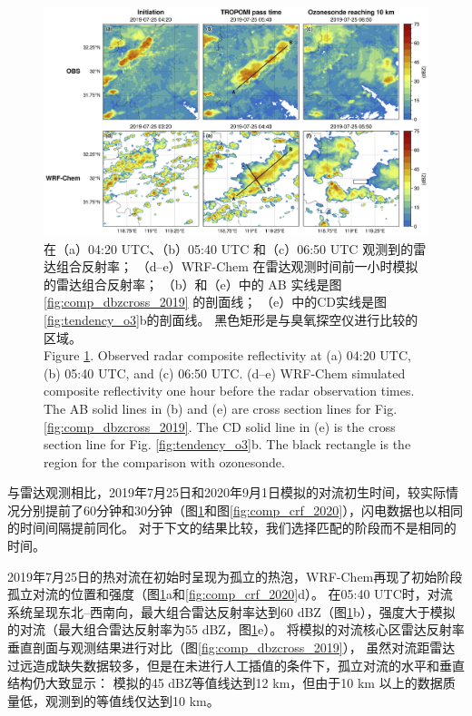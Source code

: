 \begin{figure}[H]
\centering
\includegraphics[width=\textwidth]{./figures/comp_crf_2019.png}
\caption{在（a）04:20 UTC、（b）05:40 UTC 和（c）06:50 UTC 观测到的雷达组合反射率；
         （d--e）WRF-Chem 在雷达观测时间前一小时模拟的雷达组合反射率；
         （b）和（e）中的 AB 实线是图 \ref{fig:comp_dbzcross_2019} 的剖面线；
         （e）中的CD实线是图\ref{fig:tendency_o3}b的剖面线。
         黑色矩形是与臭氧探空仪进行比较的区域。\\
         Figure \ref{fig:comp_crf_2019}. Observed radar composite reflectivity at (a) 04:20 UTC, (b) 05:40 UTC, and (c) 06:50 UTC.
        (d--e) WRF-Chem simulated composite reflectivity one hour before the radar observation times.
        The AB solid lines in (b) and (e) are cross section lines for Fig. \ref{fig:comp_dbzcross_2019}.
        The CD solid line in (e) is the cross section line for Fig. \ref{fig:tendency_o3}b.
        The black rectangle is the region for the comparison with ozonesonde.}
\label{fig:comp_crf_2019}
\end{figure}


与雷达观测相比，2019年7月25日和2020年9月1日模拟的对流初生时间，较实际情况分别提前了60分钟和30分钟（图\ref{fig:comp_crf_2019}和图\ref{fig:comp_crf_2020}），闪电数据也以相同的时间间隔提前同化。
对于下文的结果比较，我们选择匹配的阶段而不是相同的时间。

2019年7月25日的热对流在初始时呈现为孤立的热泡，WRF-Chem再现了初始阶段孤立对流的位置和强度（图\ref{fig:comp_crf_2019}a和\ref{fig:comp_crf_2020}d）。
在05:40 UTC时，对流系统呈现东北--西南向，最大组合雷达反射率达到60 dBZ（图\ref{fig:comp_crf_2019}b），强度大于模拟的对流（最大组合雷达反射率为55 dBZ，图\ref{fig:comp_crf_2019}e）。
将模拟的对流核心区雷达反射率垂直剖面与观测结果进行对比（图\ref{fig:comp_dbzcross_2019}），
虽然对流距雷达过远造成缺失数据较多，但是在未进行人工插值的条件下，孤立对流的水平和垂直结构仍大致显示：
模拟的45 dBZ等值线达到12 km，但由于10 km 以上的数据质量低，观测到的等值线仅达到10 km。

